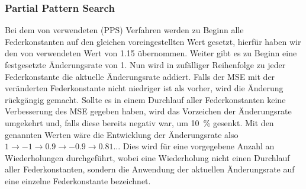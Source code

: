 \subsubsection{Partial Pattern Search}

Bei dem von \lee{} verwendeten  (PPS) Verfahren werden zu Beginn alle Federkonstanten auf den gleichen voreingestellten Wert gesetzt, hierfür  haben wir den von \lee{} verwendeten Wert von \num{1,15} %
übernommen.
Weiter gibt es zu Beginn eine festgesetzte Änderungsrate von 1.
Nun wird in zufälliger Reihenfolge zu jeder Federkonstante die aktuelle Änderungsrate addiert. Falls der MSE mit der veränderten Federkonstante nicht niedriger ist als vorher, wird die Änderung rückgängig gemacht.
Sollte es in einem Durchlauf aller Federkonstanten keine Verbesserung des MSE gegeben haben, wird das Vorzeichen der Änderungsrate umgekehrt und, falls diese bereits negativ war, um \SI{10}{\percent} gesenkt. Mit den genannten Werten wäre die Entwicklung der Änderungsrate also $1 \rightarrow -1 \rightarrow 0.9 \rightarrow -0.9 \rightarrow 0.81 \dots$
Dies wird für eine vorgegebene Anzahl an Wiederholungen durchgeführt, wobei eine Wiederholung nicht einen Durchlauf aller Federkonstanten, sondern die Anwendung der aktuellen Änderungsrate auf eine einzelne Federkonstante bezeichnet.